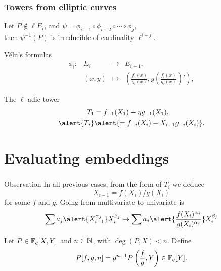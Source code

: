 \documentclass[12pt]{beamer}
\begin{document}

\begin{frame}
  \frametitle{Towers from elliptic curves}
  
  \begin{lemma}
    Let $P \not\in \ell E_i$, and $\psi=\phi_{i-1}\circ\phi_{i-2}\circ\cdots\circ\phi_{j}$,\\
    then $\psi^{-1}(P)$ is irreducible of cardinality $\ell^{i-j}$.
  \end{lemma}

  \begin{block}{V\'elu's formulas}
    \begin{equation*}
      \begin{array}{crcl}
        \phi_i: & E_i &\longrightarrow & E_{i+1},\\
        & (x,y) &\longmapsto & \left(\frac{f_i(x)}{g_i(x)}, y\left(\frac{f_i(x)}{g_i(x)}\right)'\right),
      \end{array}
    \end{equation*}
  \end{block}
  
  \begin{block}{The $\ell$-adic tower}
    \begin{align*}
      T_1 &= f_{-1}(X_1) - \eta g_{-1}(X_1),\\ 
      \alert{T_i} &\alert{= f_{-i}(X_i) - X_{i-1} g_{-i}(X_i)}.
    \end{align*}
  \end{block}
\end{frame}


\section{Evaluating embeddings}

\begin{frame}
  \frametitle{\insertsection}
  
  \begin{block}{Observation}
    In all previous cases, from the form of $T_i$ we deduce
    \[X_{i-1} = f(X_i)/g(X_i)\]
    for some $f$ and $g$.  
    Going from multivariate to univariate is
    \[\sum a_j \alert{X_{i-1}^{\alpha_j}} X_i^{\beta_j} \mapsto
    \sum a_j \alert{\frac{f(X_i)^{\alpha_j}}{g(X_i)^{\alpha_j}}} X_i^{\beta_j} \]
  \end{block}
  
  \begin{definition}
    Let $P \in \mathbb{F}_q[X,Y]$ and $n \in \mathbb{N}$, with $\deg(P,X)< n$. Define
    $$P[f,g,n] = g^{n-1} P\left (\frac fg, Y\right) \in \mathbb{F}_q[Y].$$
  \end{definition}
\end{frame}
\end{document}
